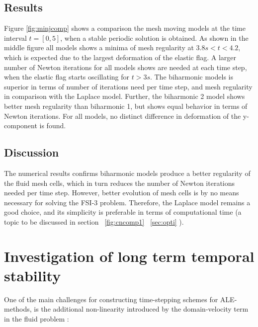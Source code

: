 \subsection*{Results}
Figure \ref{fig:minjcomp} shows a comparison the mesh moving models at the time interval  $t = [0, 5]$, when a stable periodic solution is obtained. As shown in the middle figure all models shows a minima of mesh regularity at $3.8s < t < 4.2$, which is expected due to the largest deformation of the elastic flag. A larger number of Newton iterations for all models shows are needed at each time step, when the elastic flag starts oscillating for $t > 3s$. The biharmonic models is superior in terms of number of iterations need per time step, and mesh regularity in comparison with the Laplace model. Further, the biharmonic 2 model shows better mesh regularity than biharmonic 1, but shows equal behavior in terms of Newton iterations. For all models, no distinct difference in deformation of the y-component is found.

\subsection*{Discussion}
The numerical results confirms biharmonic models produce a better regularity of the fluid mesh cells, which in turn reduces the number of Newton iterations needed per time step. However,  better evolution of mesh cells is by no means necessary for solving the FSI-3 problem. Therefore, the Laplace model remains a good choice, and its simplicity is preferable in terms of computational time (a topic to be discussed in section ~\ref{fig:cncomp1} 
~\ref{sec:opti} ).


\newpage

\section{Investigation of long term temporal stability}
One of the main challenges for constructing time-stepping schemes for ALE-methods, is the additional non-linearity introduced by the domain-velocity term in the fluid problem \cite{Formaggia2004}:

